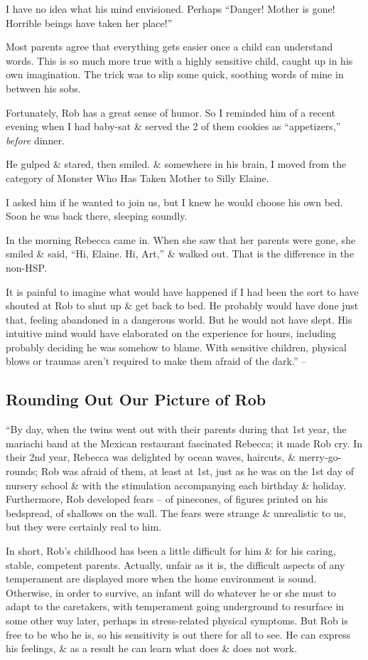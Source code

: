 \documentclass{article}
\numberwithin{equation}{section}
\begin{document}
I have no idea what his mind envisioned. Perhaps ``Danger! Mother is gone! Horrible beings have taken her place!''

Most parents agree that everything gets easier once a child can understand words. This is so much more true with a highly sensitive child, caught up in his own imagination. The trick was to slip some quick, soothing words of mine in between his sobs.

Fortunately, Rob has a great sense of humor. So I reminded him of a recent evening when I had baby-sat \& served the 2 of them cookies as ``appetizers,'' \textit{before} dinner.

He gulped \& stared, then smiled. \& somewhere in his brain, I moved from the category of Monster Who Has Taken Mother to Silly Elaine.

I asked him if he wanted to join us, but I knew he would choose his own bed. Soon he was back there, sleeping soundly.

In the morning Rebecca came in. When she saw that her parents were gone, she smiled \& said, ``Hi, Elaine. Hi, Art,'' \& walked out. That is the difference in the non-HSP.

It is painful to imagine what would have happened if I had been the sort to have shouted at Rob to shut up \& get back to bed. He probably would have done just that, feeling abandoned in a dangerous world. But he would not have slept. His intuitive mind would have elaborated on the experience for hours, including probably deciding he was somehow to blame. With sensitive children, physical blows or traumas aren't required to make them afraid of the dark.'' -- \cite[p. 59]{Aron2013}

\subsection{Rounding Out Our Picture of Rob}
``By day, when the twins went out with their parents during that 1st year, the mariachi band at the Mexican restaurant fascinated Rebecca; it made Rob cry. In their 2nd year, Rebecca was delighted by ocean waves, haircuts, \& merry-go-rounds; Rob was afraid of them, at least at 1st, just as he was on the 1st day of nursery school \& with the stimulation accompanying each birthday \& holiday. Furthermore, Rob developed fears -- of pinecones, of figures printed on his bedspread, of shallows on the wall. The fears were strange \& unrealistic to us, but they were certainly real to him.

In short, Rob's childhood has been a little difficult for him \& for his caring, stable, competent parents. Actually, unfair as it is, the difficult aspects of any temperament are displayed more when the home environment is sound. Otherwise, in order to survive, an infant will do whatever he or she must to adapt to the caretakers, with temperament going underground to resurface in some other way later, perhaps in stress-related physical symptoms. But Rob is free to be who he is, so his sensitivity is out there for all to see. He can express his feelings, \& as a result he can learn what does \& does not work.
\end{document}
